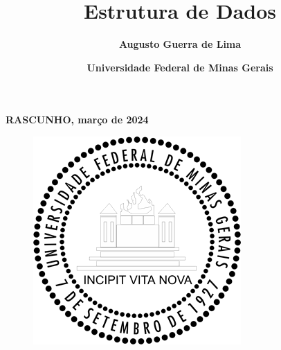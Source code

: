 \documentclass{article}
\title{\Huge\textbf{Estrutura de Dados}}
\author{\textbf{Augusto Guerra de Lima}}
\date{\textbf{Universidade Federal de Minas Gerais}}
\begin{document}
\maketitle
\textbf{RASCUNHO, março de 2024}
\begin{figure}
  \centering
  \includegraphics[width=0.2\linewidth]{img/UFMG.png}
\end{figure}

\newpage
\large

\tableofcontents

\newpage






\end{document}
